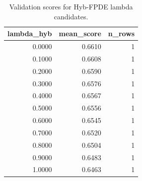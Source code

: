 \begin{table}[t]
\caption{Validation scores for Hyb-FPDE lambda candidates.}
\label{tab:lambda_distribution_computed}
\centering
\begin{tabular}{rrr}
\toprule
lambda\_hyb & mean\_score & n\_rows \\
\midrule
0.0000 & 0.6610 & 1 \\
0.1000 & 0.6608 & 1 \\
0.2000 & 0.6590 & 1 \\
0.3000 & 0.6576 & 1 \\
0.4000 & 0.6567 & 1 \\
0.5000 & 0.6556 & 1 \\
0.6000 & 0.6545 & 1 \\
0.7000 & 0.6520 & 1 \\
0.8000 & 0.6504 & 1 \\
0.9000 & 0.6483 & 1 \\
1.0000 & 0.6463 & 1 \\
\bottomrule
\end{tabular}

\end{table}
